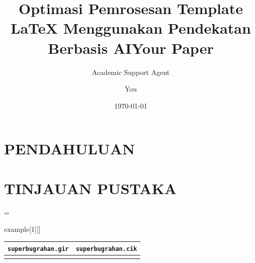 \documentclass{article}
\title{Optimasi Pemrosesan Template LaTeX Menggunakan Pendekatan Berbasis AI}
\author{Academic Support Agent}
\date{\today}
\begin{document}
\maketitle

\begin{abstract}

\end{abstract}

\chapter{PENDAHULUAN}


\chapter{TINJAUAN PUSTAKA}



\usepackage[utf8x]{inputenc}
\usepackage{amsmath}
\usepackage{graphicx,geometry}


\title{Your Paper}
\author{You}
\newlength{\thelinewidth}

\thelinewidth=\textwidth

\newlength{\exmpwidinf}
\newlength{\exmpwidouf}
\newlength{\exmpwidewid}

\thelinewidth
{}\thelinewidth
{}\thelinewidth

\newenvironment{example2}{
    \ttfamily\obeylines\obeyspaces\frenchspacing
}

\newenvironment{example}[1][]{
    \ttfamily\obeylines\obeyspaces\frenchspacing
    \newcommand{\exmp}[2]{
        \begin{minipage}[t]{\exmpwidinf}\rightskip=0pt plus 1fill\relax##1\medskip\end{minipage}&
        \begin{minipage}[t]{\exmpwidouf}\rightskip=0pt plus 1fill\relax##2\medskip\end{minipage}\\
        \hline
    }

    \begin{tabular}{|l|l|}
        \hline
        \multicolumn{1}{|c|}{\bf\texttt{superbugrahan.gir}}&
        \multicolumn{1}{|c|}{\bf\texttt{superbugrahan.cik}}\\
        \hline
}{
    \end{tabular}
}
\end{document}
